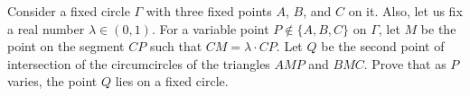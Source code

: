 Consider a fixed circle $\Gamma$ with three fixed points $A$, $B$, and $C$ on it. Also, let us fix a real number $\lambda \in (0,1)$. For a variable point $P \notin \{A, B, C\}$ on $\Gamma$, let $M$ be the point on the segment $CP$ such that $CM = \lambda \cdot CP$. Let $Q$ be the second point of intersection of the circumcircles of the triangles $AMP$ and $BMC$. Prove that as $P$ varies, the point $Q$ lies on a fixed circle.
